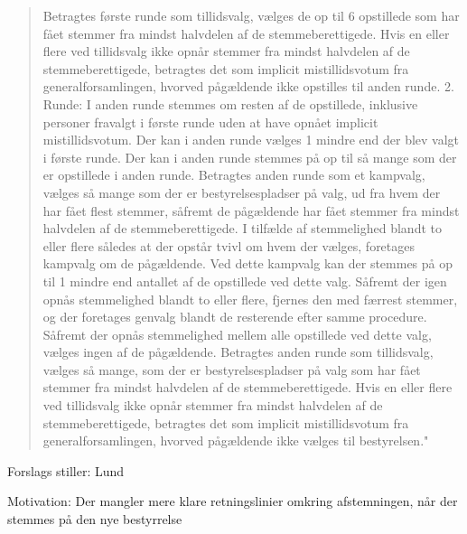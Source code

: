 \documentclass[a4paper,12pt,danish]{article}
\begin{document}
\begin{enumerate}
\begin{quote}
Betragtes første runde som tillidsvalg, vælges de op til 6 opstillede som har fået stemmer fra mindst halvdelen af de stemmeberettigede. Hvis en eller flere ved tillidsvalg ikke opnår stemmer fra mindst halvdelen af de stemmeberettigede, betragtes det som implicit mistillidsvotum fra generalforsamlingen, hvorved pågældende ikke opstilles til anden runde.
2. Runde:
I anden runde stemmes om resten af de opstillede, inklusive personer fravalgt i første runde uden at have opnået implicit mistillidsvotum. Der kan i anden runde vælges 1 mindre end der blev valgt i første runde.
Der kan i anden runde stemmes på op til så mange som der er opstillede i anden runde.
Betragtes anden runde som et kampvalg, vælges så mange som der er bestyrelsespladser på valg, ud fra hvem der har fået flest stemmer, såfremt de pågældende har fået stemmer fra mindst halvdelen af de stemmeberettigede.
I tilfælde af stemmelighed blandt to eller flere således at der opstår tvivl om hvem der vælges, foretages kampvalg om de pågældende. Ved dette kampvalg kan der stemmes på op til 1 mindre end antallet af de opstillede ved dette valg. Såfremt der igen opnås stemmelighed blandt to eller flere, fjernes den med færrest stemmer, og der foretages genvalg blandt de resterende efter samme procedure. Såfremt der opnås stemmelighed mellem alle opstillede ved dette valg, vælges ingen af de pågældende.
Betragtes anden runde som tillidsvalg, vælges så mange, som der er bestyrelsespladser på valg som har fået stemmer fra mindst halvdelen af de stemmeberettigede. Hvis en eller flere ved tillidsvalg ikke opnår stemmer fra mindst halvdelen af de stemmeberettigede, betragtes det som implicit mistillidsvotum fra generalforsamlingen, hvorved pågældende ikke vælges til bestyrelsen."
    \end{quote}

Forslags stiller: Lund

Motivation: Der mangler mere klare retningslinier omkring afstemningen, når der stemmes på den nye bestyrrelse



\end{enumerate}
\end{document}
